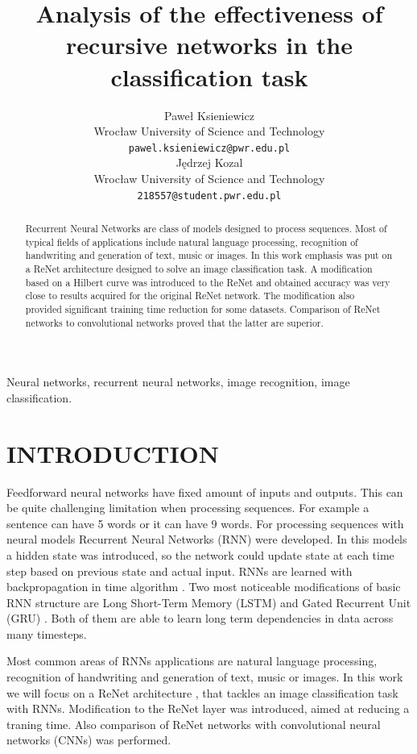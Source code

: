 \documentclass[a4paper, 10 pt, journal]{ieeeconf}
\title{\LARGE \bf
Analysis of the effectiveness of recursive
networks in the classification task
}
\author{\parbox{2 in}{\centering Paweł Ksieniewicz \\
        Wrocław University of Science and Technology\\
        {\tt\small pawel.ksieniewicz@pwr.edu.pl}}
        \hspace*{ 0.3 in}
        \parbox{2 in}{\centering Jędrzej Kozal \\
        Wrocław University of Science and Technology\\
        {\tt\small 218557@student.pwr.edu.pl}}
}
\begin{document}
\maketitle
\thispagestyle{empty}
\pagestyle{empty}

\begin{abstract}

Recurrent Neural Networks are class of models designed to process sequences. Most of typical fields of applications include natural language processing, recognition of handwriting and generation of text, music or images. In this work emphasis was put on a ReNet architecture designed to solve an image classification task. A modification based on a Hilbert curve was introduced to the ReNet and obtained accuracy was very close to results acquired for the original ReNet network. The modification also provided significant training time reduction for some datasets. Comparison of ReNet networks to convolutional networks proved that the latter are superior.

\end{abstract}

\begin{keywords}
Neural networks, recurrent neural networks, image recognition, image classification.
\end{keywords}

\section{INTRODUCTION}

Feedforward neural networks have fixed amount of inputs and outputs. This can be quite challenging limitation when processing sequences. For example a sentence can have 5 words or it can have 9 words. For processing sequences with neural models Recurrent Neural Networks (RNN) \cite{RNN} were developed. In this models a hidden state was introduced, so the network could update state at each time step based on previous state and actual input. RNNs are learned with backpropagation in time algorithm \cite{BPTT}. Two most noticeable modifications of basic RNN structure are Long Short-Term Memory (LSTM) \cite{LSTM} and Gated Recurrent Unit (GRU) \cite{DBLP:journals/corr/ChoMGBSB14}. Both of them are able to learn long term dependencies in data across many timesteps.

Most common areas of RNNs applications are natural language processing, recognition of handwriting and generation of text, music or images. In this work we will focus on a ReNet architecture \cite{DBLP:journals/corr/VisinKCMCB15}, that tackles an image classification task with RNNs. Modification to the ReNet layer was introduced, aimed at reducing a traning time. Also comparison of ReNet networks with convolutional neural networks (CNNs) was performed.
\end{document}
